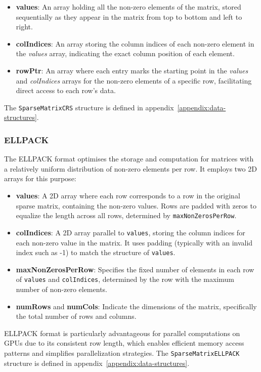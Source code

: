 \documentclass[12pt,oneside]{book} %
\begin{document}
\begin{itemize}
    \item \textbf{values}: An array holding all the non-zero elements of the matrix, stored sequentially as they appear in the matrix from top to bottom and left to right.
    \item \textbf{colIndices}: An array storing the column indices of each non-zero element in the \textit{values} array, indicating the exact column position of each element.
    \item \textbf{rowPtr}: An array where each entry marks the starting point in the \textit{values} and \textit{colIndices} arrays for the non-zero elements of a specific row, facilitating direct access to each row's data.
\end{itemize}

The \texttt{SparseMatrixCRS} structure is defined in
appendix~\ref{appendix:data-structures}.

\subsubsection{ELLPACK }
The ELLPACK format optimises the storage and computation for matrices with a
relatively uniform distribution of non-zero elements per row. It employs two 2D
arrays for this purpose:

\begin{itemize}
    \item \textbf{values}: A 2D array where each row corresponds to a row in the original sparse matrix, containing the non-zero values. Rows are padded with zeros to equalize the length across all rows, determined by \texttt{maxNonZerosPerRow}.
    \item \textbf{colIndices}: A 2D array parallel to \texttt{values}, storing the column indices for each non-zero value in the matrix. It uses padding (typically with an invalid index such as -1) to match the structure of \texttt{values}.
    \item \textbf{maxNonZerosPerRow}: Specifies the fixed number of elements in each row of \texttt{values} and \texttt{colIndices}, determined by the row with the maximum number of non-zero elements.
    \item \textbf{numRows} and \textbf{numCols}: Indicate the dimensions of the matrix, specifically the total number of rows and columns.
\end{itemize}

ELLPACK format is particularly advantageous for parallel computations on GPUs
due to its consistent row length, which enables efficient memory access
patterns and simplifies parallelization strategies. The
\texttt{SparseMatrixELLPACK} structure is defined in
appendix~\ref{appendix:data-structures}.
\end{document}
